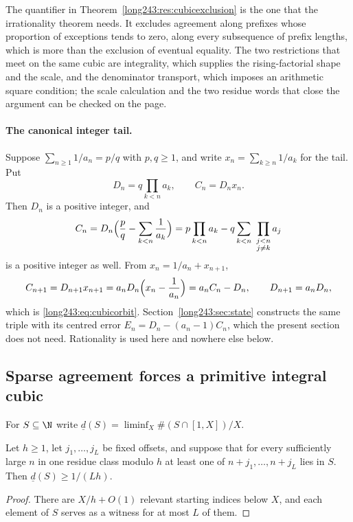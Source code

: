 \documentclass[11pt]{article}
\begin{document}
The quantifier in Theorem~\ref{long243:res:cubicexclusion} is the one that the
irrationality theorem needs.  It excludes agreement along prefixes whose
proportion of exceptions tends to zero, along every subsequence of prefix
lengths, which is more than the exclusion of eventual equality.  The two restrictions that meet on
the same cubic are integrality, which supplies the rising-factorial shape and
the scale, and the denominator transport, which imposes an arithmetic square
condition; the scale calculation and the two residue words that close the
argument can be checked on the page.

\paragraph{The canonical integer tail.}
Suppose $\sum_{n\ge1}1/a_n=p/q$ with $p,q\ge1$, and write
$x_n=\sum_{k\ge n}1/a_k$ for the tail.  Put
\[
 D_n=q\prod_{k<n}a_k,\qquad C_n=D_nx_n .
\]
Then $D_n$ is a positive integer, and
\[
 C_n=D_n\Bigl(\frac pq-\sum_{k<n}\frac1{a_k}\Bigr)
    =p\prod_{k<n}a_k-q\sum_{k<n}\ \prod_{\substack{j<n\\ j\ne k}}a_j
\]
is a positive integer as well.  From $x_n=1/a_n+x_{n+1}$,
\[
 C_{n+1}=D_{n+1}x_{n+1}=a_nD_n\Bigl(x_n-\frac1{a_n}\Bigr)=a_nC_n-D_n,
 \qquad D_{n+1}=a_nD_n,
\]
which is \eqref{long243:eq:cubicorbit}.  Section~\ref{long243:sec:state} constructs the same
triple with its centred error $E_n=D_n-(a_n-1)C_n$, which the present section
does not need.  Rationality is used here and nowhere else below.

\subsection{Sparse agreement forces a primitive integral cubic}

For $S\subseteq\N$ write $\underline d(S)=\liminf_X\#(S\cap[1,X])/X$.

\begin{lemma}\label{long243:res:periodicobstruction}
Let $h\ge1$, let $j_1,\ldots,j_L$ be fixed offsets, and suppose that for every
sufficiently large $n$ in one residue class modulo $h$ at least one of
$n+j_1,\ldots,n+j_L$ lies in $S$.  Then $\underline d(S)\ge1/(Lh)$.
\end{lemma}

\begin{proof}
There are $X/h+O(1)$ relevant starting indices below $X$, and each element of
$S$ serves as a witness for at most $L$ of them.
\end{proof}
\end{document}
